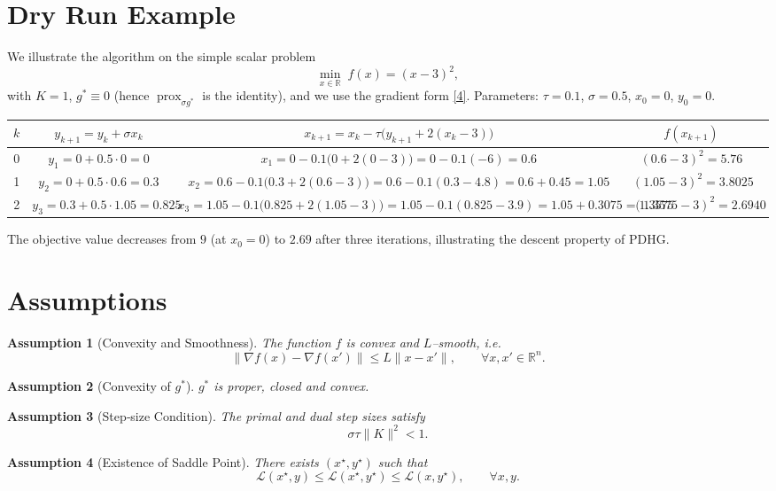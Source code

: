 \documentclass{article}
\newtheorem{assumption}{Assumption}
\newcommand{\prox}{\operatorname{prox}}
\begin{document}
\section*{Dry Run Example}
We illustrate the algorithm on the simple scalar problem
\[
\min_{x\in\mathbb{R}} \; f(x)=(x-3)^{2},
\]
with $K=1$, $g^{*}\equiv0$ (hence $\prox_{\sigma g^{*}}$ is the identity), and we use the gradient form \eqref{4}.  
Parameters: $\tau=0.1$, $\sigma=0.5$, $x_{0}=0$, $y_{0}=0$.

\begin{center}
\begin{tabular}{c|c|c|c|c}
$k$ & $y_{k+1}=y_{k}+\sigma x_{k}$ & $x_{k+1}=x_{k}-\tau\bigl(y_{k+1}+2(x_{k}-3)\bigr)$ & $f(x_{k+1})$\\ \hline
0 &
$y_{1}=0+0.5\cdot0=0$ &
$x_{1}=0-0.1\bigl(0+2(0-3)\bigr)=0-0.1(-6)=0.6$ &
$(0.6-3)^{2}=5.76$\\[4pt]
1 &
$y_{2}=0+0.5\cdot0.6=0.3$ &
$x_{2}=0.6-0.1\bigl(0.3+2(0.6-3)\bigr)=0.6-0.1(0.3-4.8)=0.6+0.45=1.05$ &
$(1.05-3)^{2}=3.8025$\\[4pt]
2 &
$y_{3}=0.3+0.5\cdot1.05=0.825$ &
$x_{3}=1.05-0.1\bigl(0.825+2(1.05-3)\bigr)=1.05-0.1(0.825-3.9)=1.05+0.3075=1.3575$ &
$(1.3575-3)^{2}=2.6940$\\
\end{tabular}
\end{center}
The objective value decreases from $9$ (at $x_{0}=0$) to $2.69$ after three iterations, illustrating the descent property of PDHG.

\newpage
\section*{Assumptions}
\begin{assumption}[Convexity and Smoothness]\label{ass:convex}
The function $f$ is convex and $L$–smooth, i.e.
\[
\|\nabla f(x)-\nabla f(x')\|\le L\|x-x'\|,\qquad\forall x,x'\in\mathbb{R}^{n}.
\]
\end{assumption}
\begin{assumption}[Convexity of $g^{*}$]\label{ass:gstar}
$g^{*}$ is proper, closed and convex.
\end{assumption}
\begin{assumption}[Step‑size Condition]\label{ass:steps}
The primal and dual step sizes satisfy
\[
\sigma\tau\|K\|^{2}<1 .
\]
\end{assumption}
\begin{assumption}[Existence of Saddle Point]\label{ass:saddle}
There exists $(x^{\star},y^{\star})$ such that
\[
\mathcal{L}(x^{\star},y)\le\mathcal{L}(x^{\star},y^{\star})\le\mathcal{L}(x,y^{\star}),\qquad\forall x,y.
\]
\end{assumption}
\end{document}
